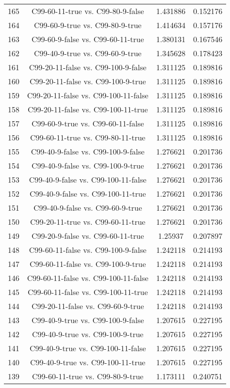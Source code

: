 \documentclass[a4paper,10pt]{article}
\begin{document}
\begin{landscape}
\begin{table}[!htp]
\begin{tabular}{cccc}
165&C99-60-11-true vs. C99-80-9-false&1.431886&0.152176\\
164&C99-60-9-true vs. C99-80-9-true&1.414634&0.157176\\
163&C99-60-9-false vs. C99-60-11-true&1.380131&0.167546\\
162&C99-40-9-true vs. C99-60-9-true&1.345628&0.178423\\
161&C99-20-11-false vs. C99-100-9-false&1.311125&0.189816\\
160&C99-20-11-false vs. C99-100-9-true&1.311125&0.189816\\
159&C99-20-11-false vs. C99-100-11-false&1.311125&0.189816\\
158&C99-20-11-false vs. C99-100-11-true&1.311125&0.189816\\
157&C99-60-9-true vs. C99-60-11-false&1.311125&0.189816\\
156&C99-60-11-true vs. C99-80-11-true&1.311125&0.189816\\
155&C99-40-9-false vs. C99-100-9-false&1.276621&0.201736\\
154&C99-40-9-false vs. C99-100-9-true&1.276621&0.201736\\
153&C99-40-9-false vs. C99-100-11-false&1.276621&0.201736\\
152&C99-40-9-false vs. C99-100-11-true&1.276621&0.201736\\
151&C99-40-9-false vs. C99-60-9-true&1.276621&0.201736\\
150&C99-20-11-true vs. C99-60-11-true&1.276621&0.201736\\
149&C99-20-9-false vs. C99-60-11-true&1.25937&0.207897\\
148&C99-60-11-false vs. C99-100-9-false&1.242118&0.214193\\
147&C99-60-11-false vs. C99-100-9-true&1.242118&0.214193\\
146&C99-60-11-false vs. C99-100-11-false&1.242118&0.214193\\
145&C99-60-11-false vs. C99-100-11-true&1.242118&0.214193\\
144&C99-20-11-false vs. C99-60-9-true&1.242118&0.214193\\
143&C99-40-9-true vs. C99-100-9-false&1.207615&0.227195\\
142&C99-40-9-true vs. C99-100-9-true&1.207615&0.227195\\
141&C99-40-9-true vs. C99-100-11-false&1.207615&0.227195\\
140&C99-40-9-true vs. C99-100-11-true&1.207615&0.227195\\
139&C99-60-11-true vs. C99-80-9-true&1.173111&0.240751\\

\end{tabular}
\end{table}
\end{landscape}
\end{document}
